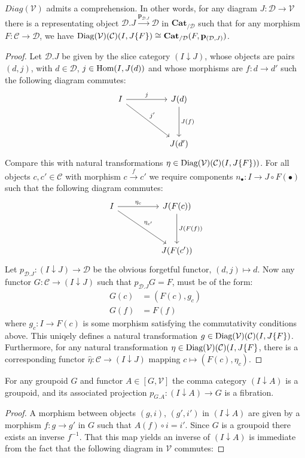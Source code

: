 \begin{thm}
$Diag(\mathcal{V})$ admits a comprehension. In other words, for any diagram $J : \mathcal{D} \to \mathcal{V}$ there is a representating object $\mathcal{D}.J \xrightarrow{\mathbf{p}_{\mathcal{D}.J}} \mathcal{D}$ in $\mathbf{Cat}_{/\mathcal{D}}$ such that for any morphism $F : \mathcal{C} \to \mathcal{D}$, we have $\operatorname{\text{Diag}}(\mathcal{V})(\mathcal{C})(I, J\{F\}) \cong \mathbf{Cat}_{/\mathcal{D}}(F, \mathbf{p}_{(\mathcal{D}, J)})$.
\begin{proof}
Let $\mathcal{D}.J$ be given by the slice category $(I \downarrow J)$, whose objects are pairs $(d, j)$, with $d \in \mathcal{D}$, $j \in \operatorname{\text{Hom}}(I,J(d))$ and whose morphisms are $f : d \to d'$ such the following diagram commutes:
\[
\ti
I \ar[r, "j"] \ar[rd, "j'"] & J(d) \ar[d,"J(f)"]\\
& J(d')
\kz
\]
Compare this with natural transformations $\eta \in \operatorname{\text{Diag}}(\mathcal{V})(\mathcal{C})(I, J\{F\}))$. For all objects $c, c' \in \mathcal{C}$ with morphism $c \xrightarrow{f} c'$ we require components $n_{\bullet} : I \to J \circ F(\bullet)$ such that the following diagram commutes:
\[
\ti
I \ar[r, "\eta_c"] \ar[rd, "\eta_{c'}"] & J(F(c)) \ar[d,"J(F(f))"]\\
& J(F(c'))
\kz
\]
Let $p_{\mathcal{D}.J} : (I \downarrow J) \to \mathcal{D}$ be the obvious forgetful functor, $(d, j) \mapsto d$. Now any functor $G : \mathcal{C} \to (I \downarrow J)$ such that $p_{\mathcal{D}.J}G = F$, must be of the form:
\[
\begin{split}
G(c) &= (F(c), g_c)\\
G(f) &= F(f)
\end{split}
\]
where $g_c : I \to F(c)$ is some morphism satisfying the commutativity conditions above. This uniqely defines a natural transformation $g \in \operatorname{\text{Diag}}(\mathcal{V})(\mathcal{C})(I, J\{F\})$. Furthermore, for any natural transformation $\eta \in \operatorname{\text{Diag}}(\mathcal{V})(\mathcal{C})(I, J\{F\}$, there is a corresponding functor $\hat \eta : \mathcal{C} \to (I \downarrow J)$ mapping $c \mapsto (F(c), \eta_c)$.
\end{proof}
\begin{lemm}
For any groupoid $G$ and functor $A \in [G, \mathcal{V}]$ the comma category $(I \downarrow A)$ is a groupoid, and its associated projection $p_{G.A} : (I \downarrow A) \to G$ is a fibration.
\begin{proof}
A morphism between objects $(g, i)$, $(g', i')$ in $(I \downarrow A)$ are given by a morphism $f : g \to g'$ in $G$ such that $A(f) \circ i = i'$. Since $G$ is a groupoid there exists an inverse $f^{-1}$. That this map yields an inverse of $(I \downarrow A)$ is immediate from the fact that the following diagram in $\mathcal{V}$ commutes:

\end{proof}
\end{lemm}
\end{thm}
